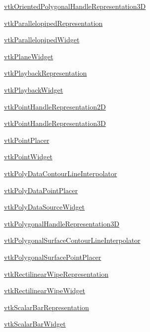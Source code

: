 \begin{DoxyItemize}
\item \hyperlink{vtkwidgets_vtkorientedpolygonalhandlerepresentation3d}{vtk\-Oriented\-Polygonal\-Handle\-Representation3\-D}  
\item \hyperlink{vtkwidgets_vtkparallelopipedrepresentation}{vtk\-Parallelopiped\-Representation}  
\item \hyperlink{vtkwidgets_vtkparallelopipedwidget}{vtk\-Parallelopiped\-Widget}  
\item \hyperlink{vtkwidgets_vtkplanewidget}{vtk\-Plane\-Widget}  
\item \hyperlink{vtkwidgets_vtkplaybackrepresentation}{vtk\-Playback\-Representation}  
\item \hyperlink{vtkwidgets_vtkplaybackwidget}{vtk\-Playback\-Widget}  
\item \hyperlink{vtkwidgets_vtkpointhandlerepresentation2d}{vtk\-Point\-Handle\-Representation2\-D}  
\item \hyperlink{vtkwidgets_vtkpointhandlerepresentation3d}{vtk\-Point\-Handle\-Representation3\-D}  
\item \hyperlink{vtkwidgets_vtkpointplacer}{vtk\-Point\-Placer}  
\item \hyperlink{vtkwidgets_vtkpointwidget}{vtk\-Point\-Widget}  
\item \hyperlink{vtkwidgets_vtkpolydatacontourlineinterpolator}{vtk\-Poly\-Data\-Contour\-Line\-Interpolator}  
\item \hyperlink{vtkwidgets_vtkpolydatapointplacer}{vtk\-Poly\-Data\-Point\-Placer}  
\item \hyperlink{vtkwidgets_vtkpolydatasourcewidget}{vtk\-Poly\-Data\-Source\-Widget}  
\item \hyperlink{vtkwidgets_vtkpolygonalhandlerepresentation3d}{vtk\-Polygonal\-Handle\-Representation3\-D}  
\item \hyperlink{vtkwidgets_vtkpolygonalsurfacecontourlineinterpolator}{vtk\-Polygonal\-Surface\-Contour\-Line\-Interpolator}  
\item \hyperlink{vtkwidgets_vtkpolygonalsurfacepointplacer}{vtk\-Polygonal\-Surface\-Point\-Placer}  
\item \hyperlink{vtkwidgets_vtkrectilinearwiperepresentation}{vtk\-Rectilinear\-Wipe\-Representation}  
\item \hyperlink{vtkwidgets_vtkrectilinearwipewidget}{vtk\-Rectilinear\-Wipe\-Widget}  
\item \hyperlink{vtkwidgets_vtkscalarbarrepresentation}{vtk\-Scalar\-Bar\-Representation}  
\item \hyperlink{vtkwidgets_vtkscalarbarwidget}{vtk\-Scalar\-Bar\-Widget}  

\end{DoxyItemize}
